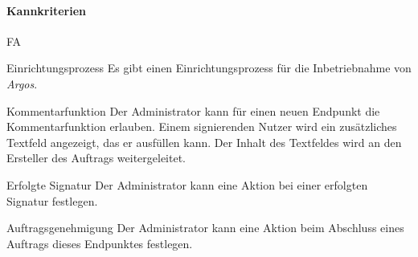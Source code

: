 \paragraph{Kannkriterien}

\begin{Kriterien}{FA}

	\item[Einrichtungsprozess] Es gibt einen Einrichtungsprozess für die Inbetriebnahme von \textit{Argos}.
	
	\newpage

	\item[Kommentarfunktion] Der Administrator kann für einen neuen Endpunkt die Kommentarfunktion erlauben. Einem signierenden Nutzer wird ein zusätzliches Textfeld angezeigt, das er ausfüllen kann. Der Inhalt des Textfeldes wird an den Ersteller des Auftrags weitergeleitet.

	\item[Erfolgte Signatur] Der Administrator kann eine Aktion bei einer erfolgten Signatur festlegen.

	\item[Auftragsgenehmigung] Der Administrator kann eine Aktion beim Abschluss eines Auftrags dieses Endpunktes festlegen.


\end{Kriterien}

